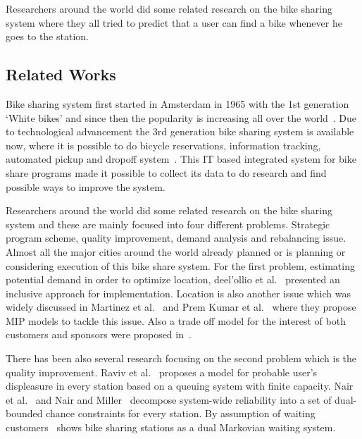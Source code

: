 Researchers around the world did some related research on the bike sharing system where they all tried to predict that a user can find a bike whenever he goes to the station. 



\subsection{Related Works}
\label {related}

Bike sharing system first started in Amsterdam in 1965 with the 1st generation `White bikes' and since then the popularity is increasing all over the world~\cite{demaio2009bike}.  Due to technological advancement the 3rd generation bike sharing system is available now, where it is possible to do bicycle reservations, information tracking, automated pickup and dropoff system~\cite{shaheen2010bikesharing}. This IT based integrated system for bike share programs made it possible to collect its data to do research and find possible ways to improve the system. 

Researchers around the world did some related research on the bike sharing system and these are mainly focused into four different problems. Strategic program scheme, quality improvement, demand analysis and rebalancing issue.
Almost all the major cities around the world already planned or is planning or considering execution of this bike share system. For the first problem, estimating potential demand in order to optimize location, deel’ollio et al.~\cite{moura2011implementing} presented an inclusive approach for implementation. Location is also another issue which was widely discussed in Martinez et al.~\cite{martinez2012optimisation} and Prem Kumar et al.~\cite{kumar2012optimizing} where they propose MIP models to tackle this issue. Also a trade off model for the interest of both customers and sponsors were proposed in~\cite{lin2011strategic}.

There has been also several research focusing on the second problem which is the quality improvement. Raviv et al.~\cite{raviv2013static} proposes a model for probable user’s displeasure in every station based on a queuing system with finite capacity. Nair et al.~\cite{nair2013large} and Nair and Miller~\cite{miller2010fleet} decompose system-wide reliability into a set of dual-bounded chance constraints for every station. By assumption of waiting customers~\cite{leurent2012modelling} shows bike sharing stations as a dual Markovian waiting system. 
 
